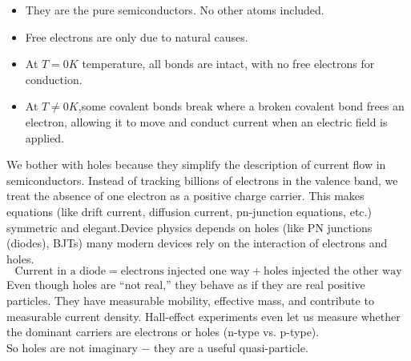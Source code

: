 \documentclass[a4aper,12pt]{report}
\newcounter{questionbox}[chapter]
\begin{document}
\begin{itemize}
    \item They are the pure semiconductors. No other atoms included. 
    \item Free electrons are only due to natural causes. 
    \item  At $ T=0K$ temperature, all bonds are intact, with no free
electrons for conduction.
    \item At $T\neq 0K$,some covalent bonds  break where a broken covalent bond frees
an electron, allowing it to move and conduct
current when an electric field is applied.
\end{itemize}
\begin{questionbox}
    We bother with holes because they simplify the description of current flow in semiconductors. Instead of tracking billions of electrons in the valence band, we treat the absence of one electron as a positive charge carrier. This makes equations (like drift current, diffusion current, pn-junction equations, etc.) symmetric and elegant.Device physics depends on holes (like PN junctions (diodes), BJTs) many modern devices rely on the interaction of electrons and holes.
$$\text{Current in a diode} = \text{electrons injected one way} + \text{holes injected the other way}$$
Even though holes are “not real,” they behave as if they are real positive particles.
They have measurable mobility, effective mass, and contribute to measurable current density.
Hall-effect experiments even let us measure whether the dominant carriers are electrons or holes (n-type vs. p-type).
\\ So holes are not imaginary $-$ they are a useful quasi-particle.
\end{questionbox}
\vspace{1em}
\end{document}
